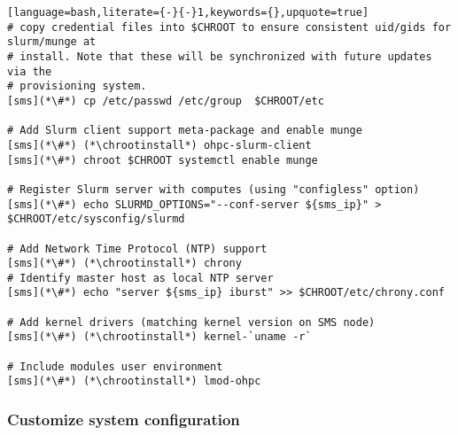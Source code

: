\documentclass[letterpaper]{article}
\newcommand{\chrootinstall}{dnf -y --installroot=\$CHROOT install}
\begin{document}
\begin{lstlisting}[language=bash,literate={-}{-}1,keywords={},upquote=true]
# copy credential files into $CHROOT to ensure consistent uid/gids for slurm/munge at
# install. Note that these will be synchronized with future updates via the
# provisioning system.
[sms](*\#*) cp /etc/passwd /etc/group  $CHROOT/etc

# Add Slurm client support meta-package and enable munge
[sms](*\#*) (*\chrootinstall*) ohpc-slurm-client
[sms](*\#*) chroot $CHROOT systemctl enable munge

# Register Slurm server with computes (using "configless" option)
[sms](*\#*) echo SLURMD_OPTIONS="--conf-server ${sms_ip}" > $CHROOT/etc/sysconfig/slurmd

# Add Network Time Protocol (NTP) support
[sms](*\#*) (*\chrootinstall*) chrony
# Identify master host as local NTP server
[sms](*\#*) echo "server ${sms_ip} iburst" >> $CHROOT/etc/chrony.conf

# Add kernel drivers (matching kernel version on SMS node)
[sms](*\#*) (*\chrootinstall*) kernel-`uname -r`

# Include modules user environment
[sms](*\#*) (*\chrootinstall*) lmod-ohpc
\end{lstlisting}

\subsubsection{Customize system configuration} \label{sec:master_customization}





\end{document}
